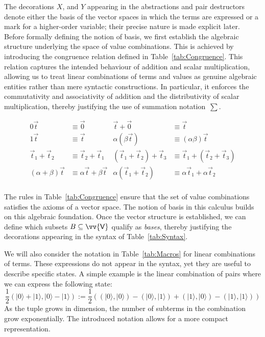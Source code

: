 \documentclass[a4paper,UKenglish,numberwithinsect,pdfa,anonymous]{lipics-v2021}
\theoremstyle{restatestyle}
\newcommand\ket[1]{\ensuremath{|#1\rangle}}
\DeclareRobustCommand{\ValD}{\ensuremath{\vv{\mathsf{V}}}}
\def\Pair#1#2{(#1,#2)} %
\begin{document}
The decorations $X$, and $Y$ appearing in the abstractions and pair
destructors denote either the basis of the vector spaces in which the terms
are expressed or a mark for a higher-order variable; their precise nature is
made explicit later. Before formally defining the notion of basis, we first
establish the algebraic structure underlying the space of value combinations.
This is achieved by introducing the congruence relation defined in
Table~\ref{tab:Congruence}.
This relation captures the intended behaviour of addition and scalar
multiplication, allowing us to treat linear combinations of terms and values
as genuine algebraic entities rather than mere syntactic constructions.
In particular, it enforces the commutativity and associativity of addition and
the distributivity of scalar multiplication, thereby justifying the use of summation
notation~$\sum$.
\begin{table}[t]
  \begin{align*}
    0\vec t &\equiv \vec 0 & \vec t+\vec 0 &\equiv \vec t \\
    1\vec{t} &\equiv \vec{t} &
    \alpha(\beta\vec{t}) &\equiv (\alpha\beta)\vec{t} \\
    \vec{t}_{1}+\vec{t}_{2} &\equiv \vec{t}_{2}+\vec{t}_{1} &
    (\vec{t}_{1}+\vec{t}_{2})+\vec{t}_{3} &\equiv \vec{t}_{1}+(\vec{t}_{2}+\vec{t}_{3}) \\
    (\alpha+\beta)\vec{t} &\equiv \alpha\vec{t}+\beta\vec{t} &
    \alpha(\vec{t}_{1}+\vec{t}_{2}) &\equiv \alpha\vec{t}_{1}+\alpha\vec{t}_{2}\\
    \end{align*}
  \caption{Term congruence}
  \label{tab:Congruence}
\end{table}

The rules in Table~\ref{tab:Congruence} ensure that the set of value combinations
satisfies the axioms of a vector space. The notion of basis in this calculus builds
on this algebraic foundation. Once the vector structure is established, we can define
which subsets $B\subseteq \ValD$ qualify as \emph{bases}, thereby justifying the
decorations appearing in the syntax of Table~\ref{tab:Syntax}.

We will also consider the notation in Table~\ref{tab:Macros} for linear
combinations of terms. These expressions do not appear in the syntax,
yet they are useful to describe specific states. A simple example is the linear
combination of pairs where we can express the following state:
\[
\frac{1}{2}\Pair{\ket{0}+\ket{1}}{\ket{0}-\ket{1}} :=
\frac{1}{2}(\Pair{\ket{0}}{\ket{0}}- \Pair{\ket{0}}{\ket{1}}
+\Pair{\ket{1}}{\ket{0}}-\Pair{\ket{1}}{\ket{1}})
\]
As the tuple grows in dimension, the number of subterms in the combination grow
exponentially. The introduced notation allows for a more compact representation.
\end{document}

